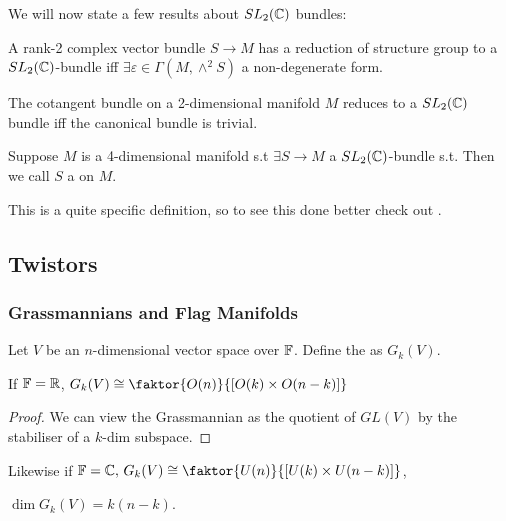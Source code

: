 \documentclass{article}
\begin{document}
We will now state a few results about $SL_2(\mathbb{C})$ bundles:
\begin{lemma}
	A rank-2 complex vector bundle $S \to M$ has a reduction of structure group to a $SL_2(\mathbb{C})$-bundle iff $\exists \varepsilon \in \Gamma(M,\wedge^2 S)$ a non-degenerate form. 
\end{lemma}
\begin{corollary}
	The cotangent bundle on a 2-dimensional manifold $M$ reduces to a $SL_2(\mathbb{C})$ bundle iff the canonical bundle is trivial.  
\end{corollary}

\begin{definition}
	Suppose $M$ is a 4-dimensional manifold s.t $\exists S \to M$ a $SL_2(\mathbb{C})$-bundle s.t. 
Then we call $S$ a  on  $M$.  
\end{definition}

\begin{remark}
	This is a quite specific definition, so to see this done better check out \cite{Michelsohn1989}. 
\end{remark}

\subsection{Twistors}
\subsubsection{Grassmannians and Flag Manifolds}
\begin{definition}
	Let $V$ be an $n$-dimensional vector space over $\mathbb{F}$. Define the  as $G_k(V)$. 
\end{definition}

\begin{lemma}
	If $\mathbb{F}= \mathbb{R}$, $G_k(V)\cong \faktor{O(n)}{[O(k) \times O(n-k)]}$
\end{lemma}
\begin{proof}
	We can view the Grassmannian as the quotient of $GL(V)$ by the stabiliser of a $k$-dim subspace. 
\end{proof}
\begin{remark}
	Likewise if $\mbb{F}=\mbb{C}, \, G_k(V) \cong \faktor{U(n)}{[U(k) \times U(n-k)]}$,
\end{remark}
\begin{corollary}
	$\dim G_k(V) = k(n-k)$. 
\end{corollary}
\end{document}
